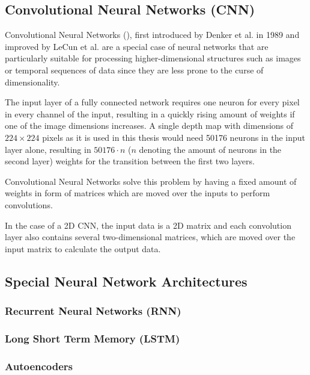 	
	\subsection { Convolutional Neural Networks (CNN) }
		Convolutional Neural Networks (), first introduced by Denker et al. in 1989 \cite{Denker1988} and improved by LeCun et al. \cite{LeCun1989} are a special case of neural networks that are particularly suitable for processing higher-dimensional structures such as images or temporal sequences of data since they are less prone to the curse of dimensionality.
		
		The input layer of a fully connected network requires one neuron for every pixel in every channel of the input, resulting in a quickly rising amount of weights if one of the image dimensions increases. A single depth map with dimensions of $224 \times 224$ pixels as it is used in this thesis would need 50176 neurons in the input layer alone, resulting in $50176 \cdot n$ ($n$ denoting the amount of neurons in the second layer) weights for the transition between the first two layers. 
		
		Convolutional Neural Networks solve this problem by having a fixed amount of weights in form of matrices which are moved over the inputs to perform convolutions.  
		
		
		
		
		
		In the case of a 2D CNN, the input data is a 2D matrix and each convolution layer also contains several two-dimensional matrices, which are moved over the input matrix to calculate the output data. 
		
		
	
	\subsection{Special Neural Network Architectures}
	
	\subsubsection { Recurrent Neural Networks (RNN) }
	
	\subsubsection { Long Short Term Memory (LSTM) }
	
	\subsubsection{Autoencoders}
	
